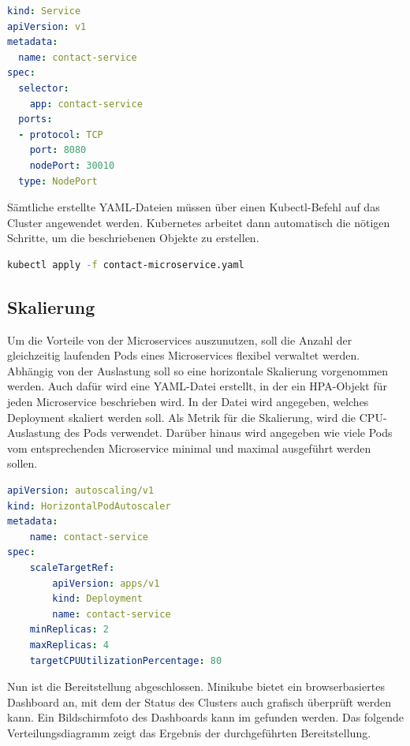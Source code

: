 \begin{lstlisting}[language=YAML, caption=Service-Objekt vom Kontakt-Microservice, captionpos=b]
kind: Service
apiVersion: v1
metadata:
  name: contact-service
spec:
  selector:
    app: contact-service
  ports:
  - protocol: TCP
    port: 8080
    nodePort: 30010
  type: NodePort
\end{lstlisting}

Sämtliche erstellte YAML-Dateien müssen über einen Kubectl-Befehl auf das Cluster angewendet werden. Kubernetes arbeitet dann automatisch die nötigen Schritte, um die beschriebenen Objekte zu erstellen.

\begin{lstlisting}[language=bash, caption=Kubectl-Befehl für das Anwenden einer YAML-Datei, captionpos=b]
kubectl apply -f contact-microservice.yaml
\end{lstlisting}

\subsection{Skalierung}
Um die Vorteile von der Microservices auszunutzen, soll die Anzahl der gleichzeitig laufenden Pods eines Microservices flexibel verwaltet werden. Abhängig von der Auslastung soll so eine horizontale Skalierung vorgenommen werden. Auch dafür wird eine YAML-Datei erstellt, in der ein \ac{HPA}-Objekt für jeden Microservice beschrieben wird. In der Datei wird angegeben, welches Deployment skaliert werden soll. Als Metrik für die Skalierung, wird die CPU-Auslastung des Pods verwendet. Darüber hinaus wird angegeben wie viele Pods vom entsprechenden Microservice minimal und maximal ausgeführt werden sollen.

\begin{lstlisting}[language=YAML, caption=HPA-Objekt vom Kontakt-Microservice, captionpos=b]
apiVersion: autoscaling/v1
kind: HorizontalPodAutoscaler
metadata:
    name: contact-service
spec:
    scaleTargetRef:
        apiVersion: apps/v1
        kind: Deployment
        name: contact-service
    minReplicas: 2
    maxReplicas: 4
    targetCPUUtilizationPercentage: 80
\end{lstlisting}

Nun ist die Bereitstellung abgeschlossen. Minikube bietet ein browserbasiertes Dashboard an, mit dem der Status des Clusters auch grafisch überprüft werden kann. Ein Bildschirmfoto des Dashboards kann im  gefunden werden. Das folgende Verteilungsdiagramm zeigt das Ergebnis der durchgeführten Bereitstellung.


